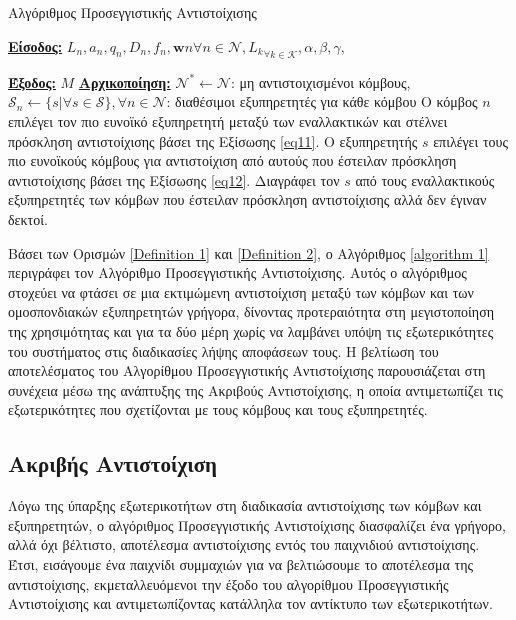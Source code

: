 \begin{algorithm}[h]
\caption{Αλγόριθμος Προσεγγιστικής Αντιστοίχισης} \label{algorithm 1}
\begin{algorithmic}[1]
\STATE \textbf{\underline{Είσοδος:}} ${L_n, a_n, q_n, D_n, f_n, \mathbf{w}n}{\forall n\in \mathcal{N}}, {L_k}_{\forall k \in \mathcal{K}}, \alpha,\beta,\gamma$,

\STATE \textbf{\underline{Έξοδος:}}  $M$
\STATE \textbf{\underline{Αρχικοποίηση:}} $\mathcal{N}^* \gets \mathcal{N}$: μη αντιστοιχισμένοι κόμβους, $\mathcal{S}_n \gets \{ s | \forall s \in \mathcal{S}\}, \forall n \in \mathcal{N}$: διαθέσιμοι εξυπηρετητές για κάθε κόμβου
\STATE Ο κόμβος $n$ επιλέγει τον πιο ευνοϊκό εξυπηρετητή μεταξύ των εναλλακτικών και στέλνει πρόσκληση αντιστοίχισης βάσει της Εξίσωσης \ref{eq11}.
\ENDFOR
{}
\STATE Ο εξυπηρετητής $s$ επιλέγει τους πιο ευνοϊκούς κόμβους για αντιστοίχιση από αυτούς που έστειλαν πρόσκληση αντιστοίχισης βάσει της Εξίσωσης \ref{eq12}.
\STATE Διαγράφει τον $s$ από τους εναλλακτικούς εξυπηρετητές των κόμβων που έστειλαν πρόσκληση αντιστοίχισης αλλά δεν έγιναν δεκτοί.
\ENDIF
\ENDFOR
\ENDWHILE
\end{algorithmic}
\end{algorithm}
\vspace{-7pt}
Βάσει των Ορισμών \ref{Definition 1} και \ref{Definition 2}, ο Αλγόριθμος \ref{algorithm 1} περιγράφει τον Αλγόριθμο Προσεγγιστικής Αντιστοίχισης. Αυτός ο αλγόριθμος στοχεύει να φτάσει σε μια εκτιμώμενη αντιστοίχιση μεταξύ των κόμβων και των ομοσπονδιακών εξυπηρετητών γρήγορα, δίνοντας προτεραιότητα στη μεγιστοποίηση της χρησιμότητας και για τα δύο μέρη χωρίς να λαμβάνει υπόψη τις εξωτερικότητες του συστήματος στις διαδικασίες λήψης αποφάσεων τους. Η βελτίωση του αποτελέσματος του Αλγορίθμου Προσεγγιστικής Αντιστοίχισης παρουσιάζεται στη συνέχεια μέσω της ανάπτυξης της Ακριβούς Αντιστοίχισης, η οποία αντιμετωπίζει τις εξωτερικότητες που σχετίζονται με τους κόμβους και τους εξυπηρετητές.

\subsection{Ακριβής Αντιστοίχιση}

Λόγω της ύπαρξης εξωτερικοτήτων στη διαδικασία αντιστοίχισης των κόμβων και εξυπηρετητών, ο αλγόριθμος Προσεγγιστικής Αντιστοίχισης διασφαλίζει ένα γρήγορο, αλλά όχι βέλτιστο, αποτέλεσμα αντιστοίχισης εντός του παιχνιδιού αντιστοίχισης. Έτσι, εισάγουμε ένα παιχνίδι συμμαχιών για να βελτιώσουμε το αποτέλεσμα της αντιστοίχισης, εκμεταλλευόμενοι την έξοδο του αλγορίθμου Προσεγγιστικής Αντιστοίχισης και αντιμετωπίζοντας κατάλληλα τον αντίκτυπο των εξωτερικοτήτων.

